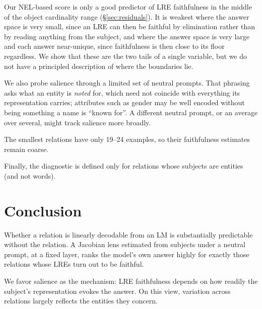\documentclass{article}
\begin{document}
Our NEL-based score is only a good predictor of LRE faithfulness in the middle of the object cardinality range
(\S\ref{sec:residuals}).
It is weakest where the answer space is very
small, since an LRE can then be faithful by elimination rather than by
reading anything from the subject, and where the answer space is very
large and each answer near-unique, since faithfulness is then close to its
floor regardless. We show that these are the two tails of a single
variable, but we do not have a principled description of where the boundaries
lie.


We also probe salience through a limited set of neutral prompts. That phrasing asks what an entity is \emph{noted} for, which need not coincide with everything its
representation carries; attributes such as gender may be well encoded
without being something a name is ``known for''. A different neutral
prompt, or an average over several, might track salience more broadly.

The smallest relations have only 19--24 examples, so their faithfulness
estimates remain coarse.

Finally, the diagnostic is
defined only for relations
whose subjects are entities
(and not words).

\section{Conclusion}

Whether a relation is linearly decodable from an LM  is
substantially predictable without the relation. A Jacobian lens estimated
from subjects
under a neutral prompt, at a fixed layer, ranks
the model's own answer highly for exactly those relations whose LREs turn
out to be faithful.

We favor salience as the mechanism: LRE faithfulness depends on how readily
the subject's representation evokes the answer. On this view, variation
across relations largely reflects the entities they concern.

\end{document}
